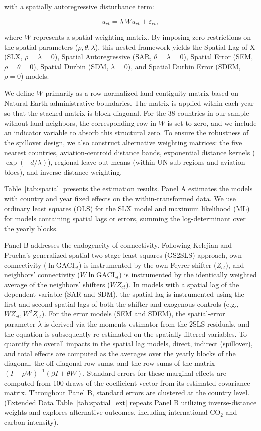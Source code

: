 \documentclass[12pt]{extarticle}
\begin{document}
with a spatially autoregressive disturbance term:

\begin{equation}
u_{ct} = \lambda \, W u_{ct} + \varepsilon_{ct},
\label{eq:spatial_error}
\end{equation}

where $W$ represents a spatial weighting matrix. By imposing zero restrictions on the spatial parameters ($\rho, \theta, \lambda$), this nested framework yields the Spatial Lag of X (SLX, $\rho=\lambda=0$), Spatial Autoregressive (SAR, $\theta=\lambda=0$), Spatial Error (SEM, $\rho=\theta=0$), Spatial Durbin (SDM, $\lambda=0$), and Spatial Durbin Error (SDEM, $\rho=0$) models.

We define $W$ primarily as a row-normalized land-contiguity matrix based on Natural Earth administrative boundaries. The matrix is applied within each year so that the stacked matrix is block-diagonal. For the 38 countries in our sample without land neighbors, the corresponding row in $W$ is set to zero, and we include an indicator variable to absorb this structural zero. To ensure the robustness of the spillover design, we also construct alternative weighting matrices: the five nearest countries, aviation-centroid distance bands, exponential distance kernels ($\exp(-d/\lambda)$), regional leave-out means (within UN sub-regions and aviation blocs), and inverse-distance weighting. 

Table~\ref{tab:spatial} presents the estimation results. Panel A estimates the models with country and year fixed effects on the within-transformed data. We use ordinary least squares (OLS) for the SLX model and maximum likelihood (ML) for models containing spatial lags or errors, summing the log-determinant over the yearly blocks. 

Panel B addresses the endogeneity of connectivity. Following Kelejian and Prucha's generalized spatial two-stage least squares (GS2SLS) approach, own connectivity ($\ln \mathrm{GACI}_{ct}$) is instrumented by the own Feyrer shifter ($Z_{ct}$), and neighbors' connectivity ($W \ln \mathrm{GACI}_{ct}$) is instrumented by the identically weighted average of the neighbors' shifters ($W Z_{ct}$). In models with a spatial lag of the dependent variable (SAR and SDM), the spatial lag is instrumented using the first and second spatial lags of both the shifter and exogenous controls (e.g., $W Z_{ct}, W^2 Z_{ct}$). For the error models (SEM and SDEM), the spatial-error parameter $\lambda$ is derived via the moments estimator from the 2SLS residuals, and the equation is subsequently re-estimated on the spatially filtered variables. To quantify the overall impacts in the spatial lag models, direct, indirect (spillover), and total effects are computed as the averages over the yearly blocks of the diagonal, the off-diagonal row sums, and the row sums of the matrix $(I-\rho W)^{-1}(\beta I + \theta W)$. Standard errors for these marginal effects are computed from 100 draws of the coefficient vector from its estimated covariance matrix. Throughout Panel B, standard errors are clustered at the country level. (Extended Data Table~\ref{tab:spatial_ext} repeats Panel B utilizing inverse-distance weights and explores alternative outcomes, including international CO$_2$ and carbon intensity).
\end{document}
